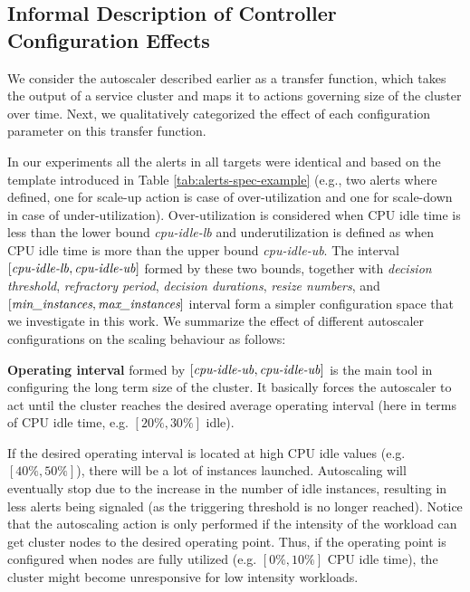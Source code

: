    \subsection{Informal Description of Controller Configuration Effects}
We consider the autoscaler described earlier as a transfer function, which takes the output of a service cluster and maps it to actions governing size of the cluster over time.    
Next, we qualitatively categorized the effect of each configuration parameter on this transfer function.

In our experiments all the alerts in all targets were identical and based on the template introduced in Table \ref{tab:alerts-spec-example} (e.g., two alerts where defined, one for scale-up action is case of over-utilization and one for scale-down in case of under-utilization).
Over-utilization is considered when CPU idle time is less than the lower bound \textit{cpu-idle-lb} and underutilization is defined as when CPU idle time is more than the upper bound \textit{cpu-idle-ub}.
The interval $[\text{\textit{cpu-idle-lb}},\text{\textit{cpu-idle-ub}}]$ formed by these two bounds, together with {\it decision threshold}, {\it refractory period}, {\it decision durations}, {\it resize numbers}, and $[\text{{\it min\_instances}},\text{{\it max\_instances}}]$ interval form a simpler configuration space that we investigate in this work. 
We summarize the effect of different autoscaler configurations on the scaling behaviour as follows:

\textbf{Operating interval} formed by $[\text{\textit{cpu-idle-ub}},\text{\textit{cpu-idle-ub}}]$ is the main tool in configuring the long term size of the cluster. 
It basically forces the autoscaler to act until the cluster reaches the desired average operating interval (here in terms of CPU idle time, e.g. $[20\%,30\%]$ idle).

If the desired operating interval is located at high CPU idle values (e.g. $[40\%,50\%]$), there will be a lot of instances launched.
Autoscaling will eventually stop due to the increase in the number of idle instances, resulting in less alerts being signaled (as the triggering threshold is no longer reached). 
Notice that the autoscaling action is only performed if the intensity of the workload can get cluster nodes to the desired operating point. Thus, if 
the operating point is configured when nodes are fully utilized (e.g. $[0\%,10\%]$ CPU idle time), the cluster might become unresponsive for low intensity workloads.


